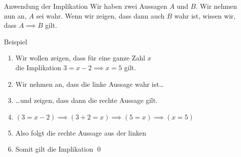 \begin{frame}{Anwendung der Implikation}
    Wir haben zwei Aussagen $A$ und $B$. Wir nehmen nun an, $A$ sei wahr. Wenn wir zeigen, dass dann auch $B$ wahr ist, wissen wir, dass $A \implies B$ gilt.
\begin{exampleblock}{Beispiel}
\begin{enumerate}
    \item<1-> Wir wollen zeigen, dass für eine ganze Zahl $x$ \\
    die Implikation $3 = x - 2 \implies x = 5$ gilt.
    \item<2-> Wir nehmen an, dass die linke Aussage wahr ist\dots
    \item<3-> \dots und zeigen, dass dann die rechte Aussage gilt.
    \item<4-> $(3 = x - 2) \implies (3 + 2 = x) \implies (5 = x) \implies (x = 5)$
    \item<5-> Also folgt die rechte Aussage aus der linken
    \item<6-> Somit gilt die Implikation \qed\;
\end{enumerate}
\end{exampleblock}
\end{frame}

